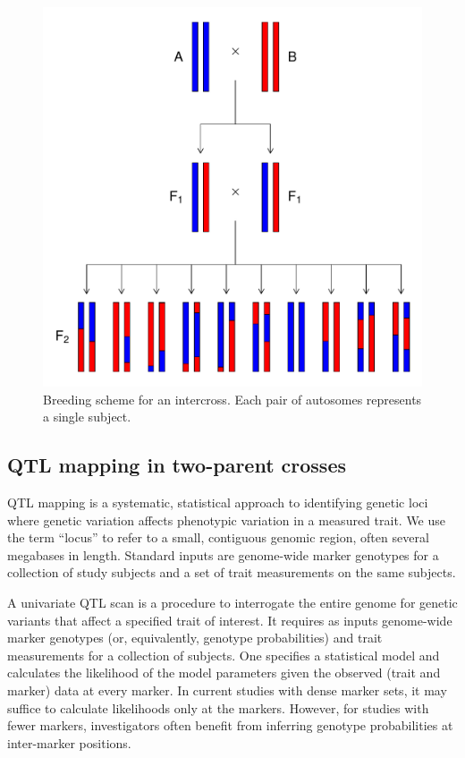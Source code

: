 \documentclass[]{article}\usepackage[]{graphicx}\usepackage[]{color}
\makeatletter
\def\maxwidth{ %
  \ifdim\Gin@nat@width>\linewidth
    \linewidth
  \else
    \Gin@nat@width
  \fi
}
\newenvironment{knitrout}{}{} %
\def\maxwidth{\ifdim\Gin@nat@width>\linewidth\linewidth\else\Gin@nat@width\fi}
\makeatother
\begin{document}
\begin{knitrout}
\color{fgcolor}\begin{figure}
\includegraphics[width=\maxwidth]{figure/intercross-1} \caption[Breeding scheme for an intercross]{Breeding scheme for an intercross. Each pair of autosomes represents a single subject.}\label{fig:intercross}
\end{figure}


\end{knitrout}


\subsection{QTL mapping in two-parent crosses}

QTL mapping is a systematic, statistical approach to identifying genetic
loci where genetic variation affects phenotypic variation in a measured trait.
We use the term ``locus'' to refer to a small, contiguous genomic region, often
several megabases in length. Standard inputs are genome-wide marker genotypes for a collection of study subjects and a set of trait measurements on the same subjects.

A univariate QTL scan is a procedure to interrogate the entire genome for genetic
variants that affect a specified trait of interest.
It requires as inputs genome-wide marker genotypes (or, equivalently,
genotype probabilities) and trait measurements for a collection of subjects.
One specifies a statistical model and calculates the
likelihood of the model parameters given the observed (trait and marker) data at every marker. In current studies with dense marker sets, 
it may suffice to calculate likelihoods only at the markers. However, for
studies with fewer markers, investigators often benefit from inferring 
genotype probabilities at inter-marker positions.
\end{document}
